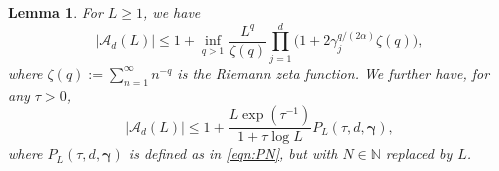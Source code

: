 \documentclass[pdflatex,sn-basic,Numbered]{sn-jnl}%
\newcommand{\bsgamma}{\boldsymbol{\gamma}}
\newcommand{\NN}{\mathbb{N}}
\newcommand{\Acal}{\mathcal{A}}
\theoremstyle{thmstyleone}%
\newtheorem{lemma}[theorem]{Lemma}
\theoremstyle{thmstyletwo}%
\begin{document}
\begin{lemma}\label{lem:Adcount} 
For $L\geq 1$, we have  
\begin{equation}\label{eqn:minoverq}
    |\Acal_d(L)|\leq 1+ \inf_{q> 1} \frac{L^{q}}{\zeta(q)} \prod_{j=1}^d \Big(1+2\gamma^{q/(2\alpha)}_j \zeta(q)\Big),
\end{equation}
where  $\zeta(q):=\sum_{n=1}^\infty n^{-q}$ is the Riemann zeta function. 
We further have, for any $\tau>0$,
    \begin{equation}\label{eqn:Adbound}
        |\Acal_d(L)|\leq 1+\frac{ L\exp(\tau^{-1})}{1+\tau\log {L} }P_{L}(\tau,d,\bsgamma),
    \end{equation}
    where $P_{L}(\tau,d,\bsgamma)$ is defined as in \eqref{eqn:PN}, but with $N\in\NN$ replaced by $L$.
\end{lemma}
\end{document}
